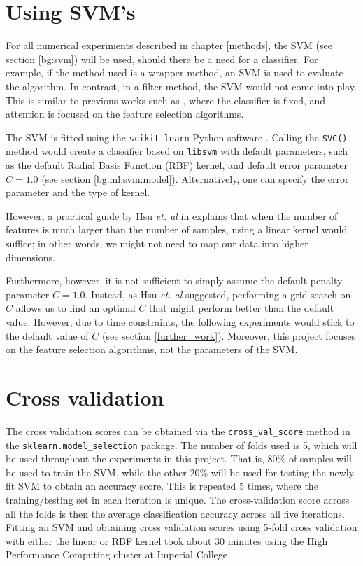 \documentclass[12pt, twoside, a4paper]{report}
\begin{document}
\section{Using SVM's} \label{data:svms}


For all numerical experiments described in chapter \ref{methods}, the SVM (see section \ref{bg:svm}) will be used, should there be a need for a classifier. For example, if the method used is a wrapper method, an SVM is used to evaluate the algorithm. In contrast, in a filter method, the SVM would not come into play. This is similar to previous works such as \cite{RefWorks:216}, where the classifier is fixed, and attention is focused on the feature selection algorithms.

The SVM is fitted using the \texttt{scikit-learn} Python software \cite{scikit-learn}. Calling the \texttt{SVC()} method would create a classifier based on \texttt{libsvm} \cite{libsvm} with default parameters, such as the default Radial Basis Function (RBF) kernel, and default error parameter $C=1.0$ (see section \ref{bg:ml:svm:model}). Alternatively, one can specify the error parameter and the type of kernel.

However, a practical guide by Hsu \textit{et. al} in \cite{RefWorks:128} explains that when the number of features is much larger than the number of samples, using a linear kernel would suffice; in other words, we might not need to map our data into higher dimensions.

Furthermore, however, it is not sufficient to simply assume the default penalty parameter $C=1.0$. Instead, as Hsu \textit{et. al} suggested, performing a grid search on $C$ allows us to find an optimal $C$ that might perform better than the default value. However, due to time constraints, the following experiments would stick to the default value of $C$ (see section \ref{further_work}). Moreover, this project focuses on the feature selection algorithms, not the parameters of the SVM.


\section{Cross validation}
The cross validation scores can be obtained via the \texttt{cross\_val\_score} method in the \texttt{sklearn.model\_selection} package. The number of folds used is 5, which will be used throughout the experiments in this project. That is, 80\% of samples will be used to train the SVM, while the other 20\% will be used for testing the newly-fit SVM to obtain an accuracy score. This is repeated 5 times, where the training/testing set in each iteration is unique. The cross-validation score across all the folds is then the average classification accuracy across all five iterations. Fitting an SVM and obtaining cross validation scores using 5-fold cross validation with either the linear or RBF kernel took about 30 minutes using the High Performance Computing cluster at Imperial College \cite{RefWorks:218}.
\end{document}
